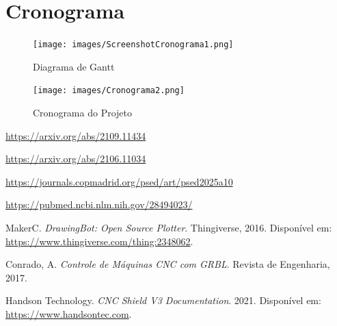 \documentclass[a4paper,12pt]{article}
\begin{document}
\vspace{1em}

\section{Cronograma}
\begin{figure}[H]
    \centering
    \texttt{[image: images/ScreenshotCronograma1.png]} %
    \caption{Diagrama de Gantt}
    \label{fig:cronograma_gantt}
\end{figure}

\vspace{1em}

\begin{figure}[H]
    \centering
    \texttt{[image: images/Cronograma2.png]} %
    \caption{Cronograma do Projeto}
    \label{fig:cronograma_projeto}
\end{figure}

\vspace{1em}

\begin{thebibliography}{9}
 \href{https://arxiv.org/abs/2109.11434}{https://arxiv.org/abs/2109.11434}

 \href{https://arxiv.org/abs/2106.11034}{https://arxiv.org/abs/2106.11034}

 \href{https://journals.copmadrid.org/psed/art/psed2025a10}{https://journals.copmadrid.org/psed/art/psed2025a10}

 \href{https://pubmed.ncbi.nlm.nih.gov/28494023/}{https://pubmed.ncbi.nlm.nih.gov/28494023/}

 MakerC. \textit{DrawingBot: Open Source Plotter}. Thingiverse, 2016. Disponível em: \url{https://www.thingiverse.com/thing:2348062}.

 Conrado, A. \textit{Controle de Máquinas CNC com GRBL}. Revista de Engenharia, 2017.

 Handson Technology. \textit{CNC Shield V3 Documentation}. 2021. Disponível em: \url{https://www.handsontec.com}.

\end{thebibliography}
\end{document}

